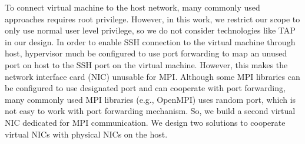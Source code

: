 To connect virtual machine to the host network, many commonly used approaches requires root privilege. However, in this work, we restrict our scope to only use normal user level privilege, so we do not consider technologies like TAP in our design. In order to enable SSH connection to the virtual machine through host, hypervisor much be configured to use port forwarding to map an unused port on host to the SSH port on the virtual machine. However, this makes the network interface card (NIC) unusable for MPI. Although some MPI libraries can be configured to use designated port and can cooperate with port forwarding, many commonly used MPI libraries (e.g., OpenMPI) uses random port, which is not easy to work with port forwarding mechanism. So, we build a second virtual NIC dedicated for MPI communication. We design two solutions to cooperate virtual NICs with physical NICs on the host. 

 
